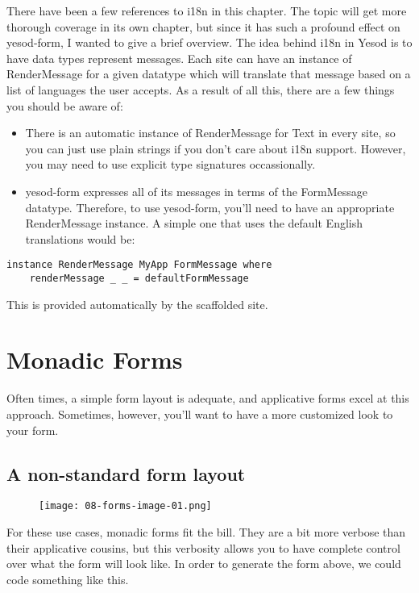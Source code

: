 There have been a few references to i18n in this chapter. The topic will get more thorough
coverage in its own chapter, but since it has such a profound effect on yesod-form, I
wanted to give a brief overview. The idea behind i18n in Yesod is to have data types
represent messages. Each site can have an instance of RenderMessage for a given datatype
which will translate that message based on a list of languages the user accepts. As a
result of all this, there are a few things you should be aware of:
\begin{itemize}
\item  There is an automatic instance of RenderMessage for Text in every site, so you can
just use plain strings if you don't care about i18n support. However, you may need to use
explicit type signatures occassionally.
\item yesod-form expresses all of its messages in terms of the FormMessage datatype.
Therefore, to use yesod-form, you'll need to have an appropriate RenderMessage instance. A
simple one that uses the default English translations would be:
\end{itemize}

\begin{lstlisting}
instance RenderMessage MyApp FormMessage where
    renderMessage _ _ = defaultFormMessage
\end{lstlisting}

This is provided automatically by the scaffolded site.

\section{Monadic Forms}

Often times, a simple form layout is adequate, and applicative forms excel at this
approach. Sometimes, however, you'll want to have a more customized look to your form.

\subsection{A non-standard form layout}
\begin{figure}[tbph]
  \centering
  \caption{}
  \texttt{[image: 08-forms-image-01.png]}
\end{figure}
For these use cases, monadic forms fit the bill. They are a bit more verbose than their
applicative cousins, but this verbosity allows you to have complete control over what the
form will look like. In order to generate the form above, we could code something like
this.

